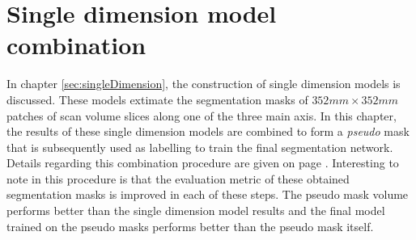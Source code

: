 \chapter{Single dimension model combination\label{sec:combination}}\thispagestyle{empty}
In chapter \ref{sec:singleDimension}, the construction of single dimension models is discussed.
These models extimate the segmentation masks of $352 mm\times 352 mm$ patches of scan volume slices along one of the three main axis.
In this chapter, the results of these single dimension models are combined to form a \textit{pseudo} mask that is subsequently used as labelling to train the final segmentation network.
Details regarding this combination procedure are given on page \pageref{sec:combinationProcedure}.
Interesting to note in this procedure is that the evaluation metric of these obtained segmentation masks is improved in each of these steps.
The pseudo mask volume performs better than the single dimension model results and the final model trained on the pseudo masks performs better than the pseudo mask itself. 

